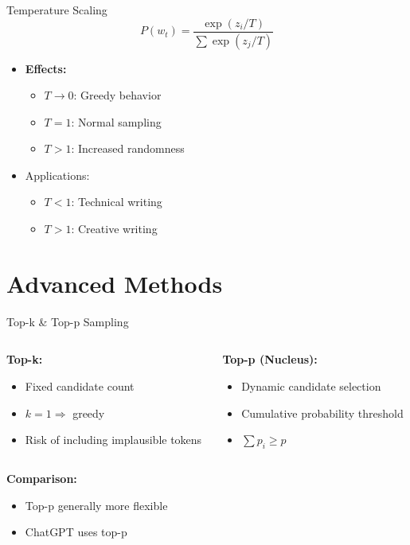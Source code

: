 \documentclass{beamer}
\begin{document}
\begin{frame}{Temperature Scaling}
\begin{equation*}
P(w_t) = \frac{\exp(z_i/T)}{\sum \exp(z_j/T)}
\end{equation*}
\begin{itemize}
\item \textbf{Effects:}
\begin{itemize}
\item $T \rightarrow 0$: Greedy behavior
\item $T = 1$: Normal sampling
\item $T > 1$: Increased randomness
\end{itemize}
\item Applications:
\begin{itemize}
\item $T < 1$: Technical writing
\item $T > 1$: Creative writing
\end{itemize}
\end{itemize}
\end{frame}

\section{Advanced Methods}

\begin{frame}{Top-k \& Top-p Sampling}
\begin{columns}
\begin{column}{0.5\textwidth}
\textbf{Top-k:}
\begin{itemize}
\item Fixed candidate count
\item $k=1 \Rightarrow$ greedy
\item Risk of including implausible tokens
\end{itemize}
\end{column}
\begin{column}{0.5\textwidth}
\textbf{Top-p (Nucleus):}
\begin{itemize}
\item Dynamic candidate selection
\item Cumulative probability threshold
\item $\sum p_i \geq p$
\end{itemize}
\end{column}
\end{columns}
\vspace{5mm}
\textbf{Comparison:}
\begin{itemize}
\item Top-p generally more flexible
\item ChatGPT uses top-p
\end{itemize}
\end{frame}
\end{document}
